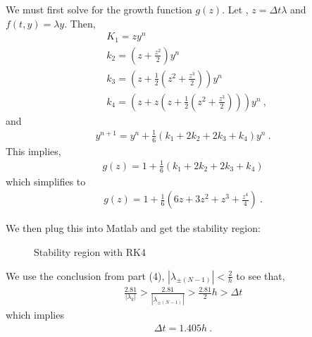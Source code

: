 \begin{questions}
\begin{solution}
 We must first solve for the growth function $g(z)$. Let , $z = \Delta t \lambda$ and $f(t,y) = \lambda y$. Then,
 \begin{align*}
 & K_1 = zy^n \\
& k_2 = \left(z + \frac{z^2}{2}\right)y^n \\
 & k_3 = \left(z + \frac{1}{2}\left(z^2 + \frac{z^3}{2}\right)\right)y^n \\
 & k_4 = \left(z + z\left(z + \frac{1}{2} \left(z^2+\frac{z^3}{2}\right)\right)\right)y^n ~,
 \end{align*}
and
\begin{align*}
y^{n+1} = y^n + \frac{1}{6}(k_1 + 2k_2 + 2k_3 + k_4)y^n~.
\end{align*}
This implies,
\begin{align*}
g(z) = 1 + \frac{1}{6}(k_1 + 2k_2 + 2k_3 + k_4)
\end{align*}
which simplifies to
\begin{align*}
g(z) = 1 + \frac{1}{6}\left(6z+3z^2+z^3+\frac{z^4}{4}\right)~.
\end{align*}

We then plug this into Matlab and get the stability region:

\begin{figure}[H]
\caption{Stability region with RK4}
\end{figure}

\end{solution}


\begin{solution}

We use the conclusion from part (4), $|\lambda_{\pm (N-1)}| < \frac{2}{h}$ to see that,
\begin{align*}
\frac{2.81}{|\lambda_k|} > \frac{2.81}{|\lambda_{\pm (N-1)}|} > \frac{2.81}{2}h > \Delta t
\end{align*}
which implies
\begin{align*}
\Delta t = 1.405h~.
\end{align*}


\end{solution}
\end{questions}
